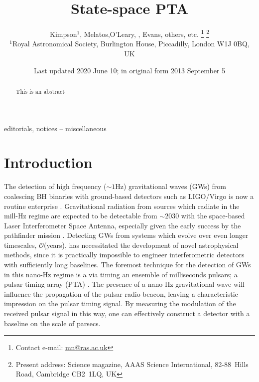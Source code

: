\documentclass[fleqn,usenatbib,useAMS]{mnras}
\title[Kalman PTA]{State-space PTA}
\author[Kimpson]{Kimpson$^{1}$, Melatos,O'Leary, , Evans, others, etc. %
\thanks{Contact e-mail: \href{mailto:mn@ras.ac.uk}{mn@ras.ac.uk}}%
\thanks{Present address: Science magazine, AAAS Science International, \mbox{82-88}~Hills Road, Cambridge CB2~1LQ, UK}%
\\
$^{1}$Royal Astronomical Society, Burlington House, Piccadilly, London W1J 0BQ, UK}
\date{Last updated 2020 June 10; in original form 2013 September 5}
\begin{document}
\label{firstpage}
\pagerange{\pageref{firstpage}--\pageref{lastpage}}
\maketitle

\begin{abstract}
This is an abstract
\end{abstract}

\begin{keywords}
editorials, notices -- miscellaneous
\end{keywords}



\begingroup
\let\clearpage\relax
\endgroup
\newpage

\section{Introduction}



The detection of high frequency ($\sim 1$Hz) gravitational waves (GWs) from coalescing BH binaries with ground-based detectors such as LIGO/Virgo \citep{aLIGO,2015CQGra..32b4001A} is now a routine enterprise \citep[e.g.][]{2019PhRvX...9c1040A,2021PhRvX..11b1053A}. Gravitational radiation from sources which radiate in the mill-Hz regime are expected to be detectable from $\sim 2030$ with the space-based Laser Interferometer Space Antenna, \citep{LISApaper} especially given the early success by the pathfinder mission \citep{2019arXiv190308924A}. Detecting GWs from systems which evolve over even longer timescales, $\mathcal{O}$(years), has necessitated the development of novel astrophysical methods, since it is practically impossible to engineer interferometric detectors with sufficiently long baselines. The foremost technique for the detection of GWs in this nano-Hz regime is a via timing an ensemble of milliseconds pulsars; a pulsar timing array (PTA) \citep{2021hgwa.bookE...4V}. The presence  of a nano-Hz gravitational wave will influence the propagation of the pulsar radio beacon, leaving a characteristic impression on the pulsar timing signal. By measuring the modulation of the received pulsar signal in this way, one can effectively construct a detector with a baseline on the scale of parsecs. \newline 
\end{document}
